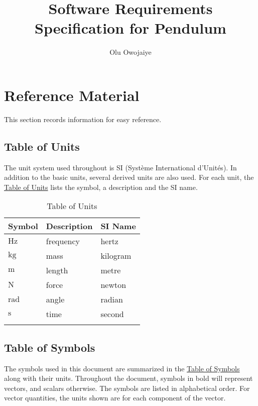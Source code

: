 \documentclass[12pt]{article}
\title{Software Requirements Specification for Pendulum}
\author{Olu Owojaiye}
\begin{document}
\maketitle
\tableofcontents
\newpage
\section{Reference Material}
\label{Sec:RefMat}
This section records information for easy reference.

\subsection{Table of Units}
\label{Sec:ToU}
The unit system used throughout is SI (Système International d'Unités). In addition to the basic units, several derived units are also used. For each unit, the \hyperref[Table:ToU]{Table of Units} lists the symbol, a description and the SI name.

\begin{longtable}{l l l}
\toprule
\textbf{Symbol} & \textbf{Description} & \textbf{SI Name}
\\
\midrule
\endhead
${\text{Hz}}$ & frequency & hertz
\\
${\text{kg}}$ & mass & kilogram
\\
${\text{m}}$ & length & metre
\\
${\text{N}}$ & force & newton
\\
${\text{rad}}$ & angle & radian
\\
${\text{s}}$ & time & second
\\
\bottomrule
\caption{Table of Units}
\label{Table:ToU}
\end{longtable}
\subsection{Table of Symbols}
\label{Sec:ToS}
The symbols used in this document are summarized in the \hyperref[Table:ToS]{Table of Symbols} along with their units. Throughout the document, symbols in bold will represent vectors, and scalars otherwise. The symbols are listed in alphabetical order. For vector quantities, the units shown are for each component of the vector.
\end{document}
